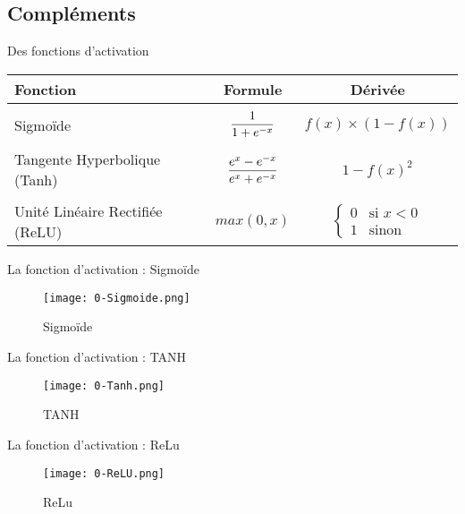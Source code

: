 \subsection{Compléments}

\begin{frame}{Des fonctions d'activation}
	\begin{block}{}
		\centering
		\begin{tabular}{ l || c | c | }
			Fonction                            & Formule                                          & Dérivée                                    \\ \hline \\
			Sigmoïde                        & $\mathlarger{\frac{1}{1+e^{-x}}}$                & $f(x) \times (1-f(x))$                     \\ \\
			Tangente Hyperbolique (Tanh)    & $\mathlarger{\frac{e^{x}-e^{-x}}{e^{x}+e^{-x}}}$ & $1-f(x)^2$                                 \\ \\
			Unité Linéaire Rectifiée (ReLU) & $max(0, x)$                                      & $ \left\{\begin{array}{ll}
					0 & \mbox{si } x<0 \\
					1 & \mbox{sinon }\end{array}\right.$ \\
		\end{tabular}
	\end{block}
\end{frame}

\begin{frame}{La fonction d'activation : Sigmoïde}
	\begin{figure}
		\centering
		\texttt{[image: 0-Sigmoide.png]}
		\caption{Sigmoïde}
	\end{figure}
\end{frame}

\begin{frame}{La fonction d'activation : TANH}
	\begin{figure}
		\centering
		\texttt{[image: 0-Tanh.png]}
		\caption{TANH}
	\end{figure}
\end{frame}

\begin{frame}{La fonction d'activation : ReLu}
	\begin{figure}
		\centering
		\texttt{[image: 0-ReLU.png]}
		\caption{ReLu}
	\end{figure}
\end{frame}

